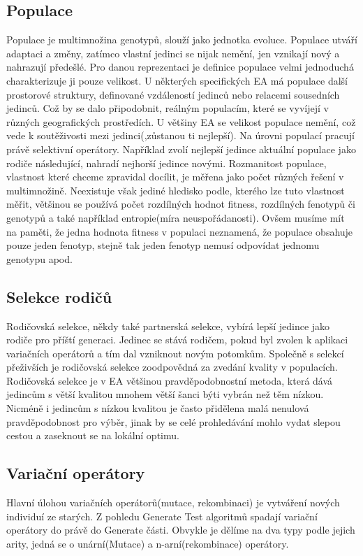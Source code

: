 \subsection{Populace}
Populace je multimnožina genotypů, slouží jako jednotka evoluce. Populace utváří adaptaci a změny, zatímco vlastní jedinci se nijak nemění, jen vznikají nový a nahrazují předešlé. Pro danou reprezentaci je definice populace velmi jednoduchá charakterizuje ji pouze velikost. U některých specifických EA má populace další prostorové struktury, definované vzdáleností jedinců nebo relacemi sousedních jedinců. Což by se dalo připodobnit, reálným populacím, které se vyvíjejí v různých geografických prostředích. U většiny EA se velikost populace nemění, což vede k soutěživosti mezi jedinci(,zůstanou ti nejlepší). Na úrovni populací pracují právě selektivní operátory. Například zvolí nejlepší jedince aktuální populace jako rodiče následující, nahradí nejhorší jedince novými. Rozmanitost populace, vlastnost které chceme zpravidal docílit, je měřena jako počet různých řešení v multimnožině. Neexistuje však jediné hledisko podle, kterého lze tuto vlastnost měřit, většinou se používá počet rozdílných hodnot fitness, rozdílných fenotypů či genotypů a také například entropie(míra neuspořádanosti). Ovšem musíme mít na paměti, že jedna hodnota fitness v populaci neznamená, že populace obsahuje pouze jeden fenotyp, stejně tak jeden fenotyp nemusí odpovídat jednomu genotypu apod. 
\subsection{Selekce rodičů}
Rodičovská selekce, někdy také partnerská selekce, vybírá lepší jedince jako rodiče pro příští generaci. Jedinec se stává rodičem, pokud byl zvolen k aplikaci variačních operátorů a tím dal vzniknout novým potomkům. Společně s selekcí přeživších je rodičovská selekce zoodpovědná za zvedání kvality v populacích. Rodičovská selekce je v EA většinou pravděpodobnostní metoda, která dává jedincům s větší kvalitou mnohem větší šanci býti vybrán než těm nízkou. Nicméně i jedincům s nízkou kvalitou je často přidělena malá nenulová pravděpodobnost pro výběr, jinak by se celé prohledávání mohlo vydat slepou cestou a zaseknout se na lokální optimu. 
\subsection{Variační operátory}
Hlavní úlohou variačních operátorů(mutace, rekombinaci) je vytváření nových individuí ze starých. Z pohledu Generate  Test algoritmů spadají variační operátory do právě do Generate části. Obvykle je dělíme na dva typy podle jejich arity, jedná se o unární(Mutace) a n-arní(rekombinace) operátory.
